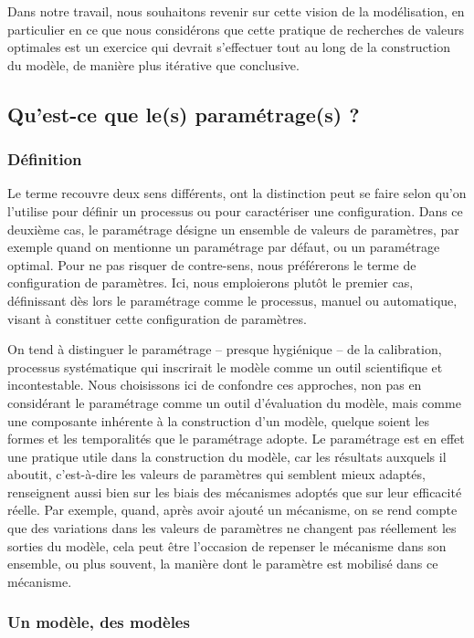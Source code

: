 \documentclass[12pt, a4paper, oneside]{book}
\begin{document}
Dans notre travail, nous souhaitons revenir sur cette vision de la modélisation, en particulier en ce que nous considérons que cette pratique de recherches de valeurs optimales est un exercice qui devrait s'effectuer tout au long de la construction du modèle, de manière plus itérative que conclusive.


\subsection{Qu'est-ce que le(s) paramétrage(s) ?}

\subsubsection{Définition}

Le terme recouvre deux sens différents, ont la distinction peut se faire selon qu'on l'utilise pour définir un processus ou pour caractériser une configuration.
Dans ce deuxième cas, le paramétrage désigne un ensemble de valeurs de paramètres, par exemple quand on mentionne un paramétrage par défaut, ou un paramétrage optimal.
Pour ne pas risquer de contre-sens, nous préférerons le terme de configuration de paramètres.
Ici, nous emploierons plutôt le premier cas, définissant dès lors le paramétrage comme le processus, manuel ou automatique, visant à constituer cette configuration de paramètres.

On tend à distinguer le paramétrage -- presque hygiénique -- de la calibration, processus systématique qui inscrirait le modèle comme un outil scientifique et incontestable.
Nous choisissons ici de confondre ces approches, non pas en considérant le paramétrage comme un outil d'évaluation du modèle, mais comme une composante inhérente à la construction d'un modèle, quelque soient les formes et les temporalités que le paramétrage adopte.
Le paramétrage est en effet une pratique utile dans la construction du modèle, car les résultats auxquels il aboutit, c'est-à-dire les valeurs de paramètres qui semblent mieux adaptés, renseignent aussi bien sur les biais des mécanismes adoptés que sur leur efficacité réelle.
Par exemple, quand, après avoir ajouté un mécanisme, on se rend compte que des variations dans les valeurs de paramètres ne changent pas réellement les sorties du modèle, cela peut être l'occasion de repenser le mécanisme dans son ensemble, ou plus souvent, la manière dont le paramètre est mobilisé dans ce mécanisme.

\subsubsection{Un modèle, des modèles}
\end{document}
